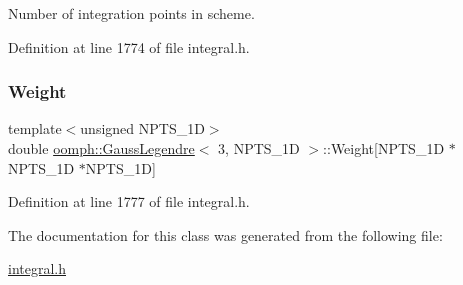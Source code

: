 Number of integration points in scheme. 



Definition at line 1774 of file integral.\+h.

\mbox{\label{classoomph_1_1GaussLegendre_3_013_00_01NPTS__1D_01_4_add90f9ee4e93eadc341d80433d7c6a35}} 
\subsubsection{\texorpdfstring{Weight}{Weight}}
{\footnotesize\ttfamily template$<$unsigned N\+P\+T\+S\+\_\+1D$>$ \\
double \hyperlink{classoomph_1_1GaussLegendre}{oomph\+::\+Gauss\+Legendre}$<$ 3, N\+P\+T\+S\+\_\+1D $>$\+::Weight\mbox{[}N\+P\+T\+S\+\_\+1D $\ast$N\+P\+T\+S\+\_\+1D $\ast$N\+P\+T\+S\+\_\+1D\mbox{]}\hspace{0.3cm}{\ttfamily [private]}}



Definition at line 1777 of file integral.\+h.



The documentation for this class was generated from the following file\+:\begin{DoxyCompactItemize}
\item 
\hyperlink{integral_8h}{integral.\+h}\end{DoxyCompactItemize}
